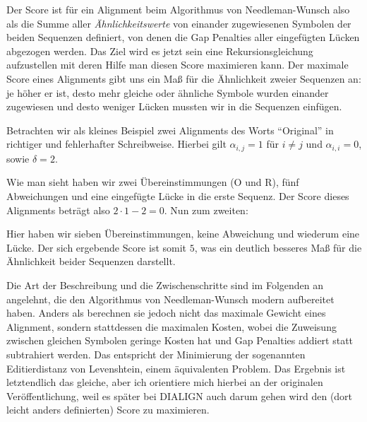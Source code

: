Der Score ist für ein Alignment beim Algorithmus von Needleman-Wunsch also als die Summe aller \emph{Ähnlichkeitswerte} von einander zugewiesenen Symbolen der beiden Sequenzen definiert, von denen die Gap Penalties aller eingefügten Lücken abgezogen werden. Das Ziel wird es jetzt sein eine Rekursionsgleichung aufzustellen mit deren Hilfe man diesen Score maximieren kann. Der maximale Score eines Alignments gibt uns ein Maß für die Ähnlichkeit zweier Sequenzen an: je höher er ist, desto mehr gleiche oder ähnliche Symbole wurden einander zugewiesen und desto weniger Lücken mussten wir in die Sequenzen einfügen.

\begin{beispiel}
	Betrachten wir als kleines Beispiel zwei Alignments des Worts \enquote{Original} in richtiger und fehlerhafter Schreibweise. Hierbei gilt $\alpha_{i,j} = 1$ für $i \neq j$ und $\alpha_{i,i} = 0$, sowie $\delta = 2$.
	
	\footnotesize
	\begin{center}
	\end{center}
	\normalsize
	
	Wie man sieht haben wir zwei Übereinstimmungen (O und R), fünf Abweichungen und eine eingefügte Lücke in die erste Sequenz. Der Score dieses Alignments beträgt also $2\cdot 1 - 2 = 0$. Nun zum zweiten:
	
	\footnotesize
	\begin{center}
	\end{center}
	\normalsize
	
	Hier haben wir sieben Übereinstimmungen, keine Abweichung und wiederum eine Lücke. Der sich ergebende Score ist somit $5$, was ein deutlich besseres Maß für die Ähnlichkeit beider Sequenzen darstellt.
\end{beispiel}

Die Art der Beschreibung und die Zwischenschritte  sind im Folgenden an \cite[S.281ff.]{kt05} angelehnt, die den Algorithmus von Needleman-Wunsch modern aufbereitet haben. Anders als \cite{nw70} berechnen sie jedoch nicht das maximale Gewicht eines Alignment, sondern stattdessen die maximalen Kosten, wobei die Zuweisung zwischen gleichen Symbolen geringe Kosten hat und Gap Penalties addiert statt subtrahiert werden. Das entspricht der Minimierung der sogenannten Editierdistanz von Levenshtein, einem äquivalenten Problem. Das Ergebnis ist letztendlich das gleiche, aber ich orientiere mich hierbei an der originalen Veröffentlichung, weil es später bei DIALIGN auch darum gehen wird den (dort leicht anders definierten) Score zu maximieren.

